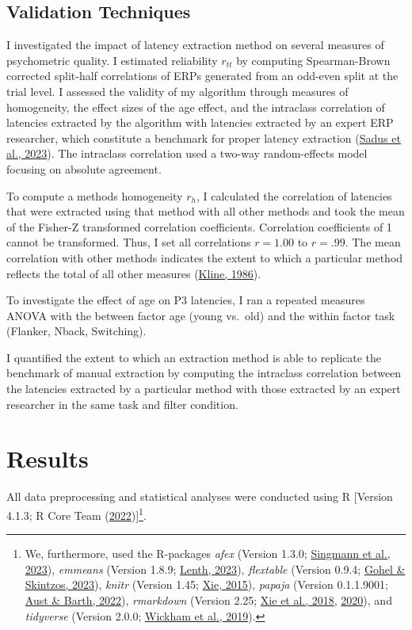 \documentclass[
  man]{apa7}
\begin{document}
\hypertarget{validation-techniques}{%
\subsection{Validation Techniques}\label{validation-techniques}}

I investigated the impact of latency extraction method on several measures of psychometric quality. I estimated reliability \(r_{tt}\) by computing Spearman-Brown corrected split-half correlations of ERPs generated from an odd-even split at the trial level. I assessed the validity of my algorithm through measures of homogeneity, the effect sizes of the age effect, and the intraclass correlation of latencies extracted by the algorithm with latencies extracted by an expert ERP researcher, which constitute a benchmark for proper latency extraction (\protect\hyperlink{ref-sadus2023multiverse}{Sadus et al., 2023}). The intraclass correlation used a two-way random-effects model focusing on absolute agreement.

To compute a methods homogeneity \(r_h\), I calculated the correlation of latencies that were extracted using that method with all other methods and took the mean of the Fisher-Z transformed correlation coefficients. Correlation coefficients of 1 cannot be transformed. Thus, I set all correlations \(r = 1.00\) to \(r = .99\). The mean correlation with other methods indicates the extent to which a particular method reflects the total of all other measures (\protect\hyperlink{ref-kline1986handbook}{Kline, 1986}).

To investigate the effect of age on P3 latencies, I ran a repeated measures ANOVA with the between factor age (young vs.~old) and the within factor task (Flanker, Nback, Switching).

I quantified the extent to which an extraction method is able to replicate the benchmark of manual extraction by computing the intraclass correlation between the latencies extracted by a particular method with those extracted by an expert researcher in the same task and filter condition.

\hypertarget{results}{%
\section{Results}\label{results}}

All data preprocessing and statistical analyses were conducted using R {[}Version 4.1.3; R Core Team (\protect\hyperlink{ref-R-base}{2022}){]}\footnote{We, furthermore, used the R-packages \emph{afex} (Version 1.3.0; \protect\hyperlink{ref-R-afex}{Singmann et al., 2023}), \emph{emmeans} (Version 1.8.9; \protect\hyperlink{ref-R-emmeans}{Lenth, 2023}), \emph{flextable} (Version 0.9.4; \protect\hyperlink{ref-R-flextable}{Gohel \& Skintzos, 2023}), \emph{knitr} (Version 1.45; \protect\hyperlink{ref-R-knitr}{Xie, 2015}), \emph{papaja} (Version 0.1.1.9001; \protect\hyperlink{ref-R-papaja}{Aust \& Barth, 2022}), \emph{rmarkdown} (Version 2.25; \protect\hyperlink{ref-R-rmarkdown_a}{Xie et al., 2018}, \protect\hyperlink{ref-R-rmarkdown_b}{2020}), and \emph{tidyverse} (Version 2.0.0; \protect\hyperlink{ref-R-tidyverse}{Wickham et al., 2019}).}.
\end{document}
